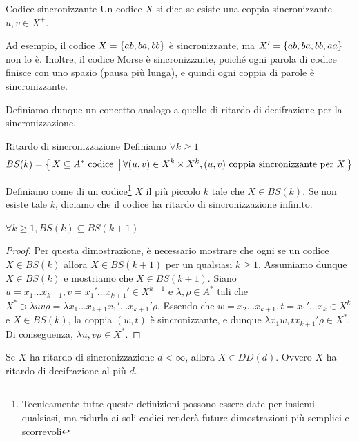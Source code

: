 \begin{definition}{Codice sincronizzante}
  Un codice \(X\) si dice  se esiste una coppia sincronizzante \(u,v \in X^+\).
\end{definition}

Ad esempio, il codice \(X = \set{ab,ba,bb}\) è sincronizzante, ma \(X' = \set{ab,ba,bb,aa}\) non lo è.
Inoltre, il codice Morse è sincronizzante, poiché ogni parola di codice finisce con uno spazio (pausa più lunga), e quindi ogni coppia di parole è sincronizzante.

Definiamo dunque un concetto analogo a quello di ritardo di decifrazione per la sincronizzazione.

\begin{definition}{Ritardo di sincronizzazione}
  Definiamo \(\forall k \geq 1\)
  \[BS(k) = \set{X \subseteq A^* \text{ codice }}[\forall (u,v) \in X^k\times X^k, (u,v) \text{ coppia sincronizzante per } X]\]
  
  Definiamo come  di un codice\footnote{Tecnicamente tutte queste definizioni possono essere date per insiemi qualsiasi, ma ridurla ai soli codici renderà future dimostrazioni più semplici e scorrevoli} \(X\) il più piccolo \(k\) tale che \(X \in BS(k)\). Se non esiste tale \(k\), diciamo che il codice ha ritardo di sincronizzazione infinito.
\end{definition}

\begin{proposition}{}
  \(\forall k \geq 1, BS(k)\subseteq BS(k+1)\)
\end{proposition}

\begin{proof}{}
  Per questa dimostrazione, è necessario mostrare che ogni se un codice \(X \in BS(k)\) allora \(X \in BS(k+1)\) per un qualsiasi \(k \geq 1\).
  Assumiamo dunque \(X \in BS(k)\) e mostriamo che \(X \in BS(k+1)\).
  Siano \(u = x_1\ldots x_{k+1},v = x_1'\ldots x_{k+1}' \in X^{k+1}\) e \(\lambda, \rho \in A^*\) tali che
  \(X^* \ni \lambda uv \rho = \lambda x_1\ldots x_{k+1}  x_1'\ldots x_{k+1}' \rho\). 
  Essendo che \(w = x_2\ldots x_{k+1}, t = x_1'\ldots x_k \in X^k\) e \(X \in BS(k)\), la coppia \((w, t)\) è sincronizzante, e dunque \(\lambda x_1 w, t x_{k+1}' \rho \in X^*\).
  Di conseguenza, \(\lambda u, v \rho \in X^*\).
\end{proof}

\begin{theorem}{}
  Se \(X\) ha ritardo di sincronizzazione \(d < \infty\), allora \(X \in DD(d)\).
  Ovvero \(X\) ha ritardo di decifrazione al più \(d\).
\end{theorem}

